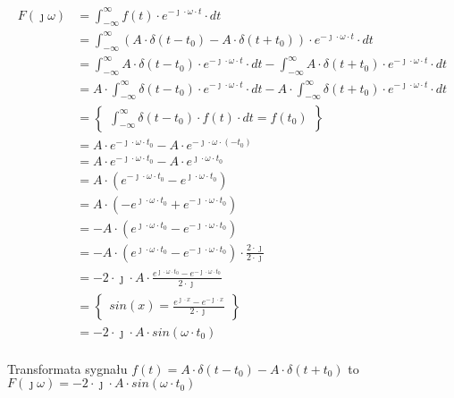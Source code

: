 \begin{task}
\begin{align*}
F(\jmath \omega )&=\int_{-\infty }^{\infty}f(t) \cdot e^{-\jmath \cdot \omega \cdot t}\cdot dt\\
&=\int_{-\infty }^{\infty} \left( A \cdot \delta(t-t_0) - A \cdot \delta(t+t_0) \right)\cdot e^{-\jmath \cdot \omega \cdot t} \cdot dt\\
&=\int_{-\infty }^{\infty} A \cdot \delta(t-t_0) \cdot e^{-\jmath \cdot \omega \cdot t} \cdot dt - \int_{-\infty }^{\infty} A \cdot \delta(t+t_0) \cdot e^{-\jmath \cdot \omega \cdot t} \cdot dt\\
&= A \cdot \int_{-\infty }^{\infty} \delta(t-t_0) \cdot e^{-\jmath \cdot \omega \cdot t} \cdot dt -  A \cdot \int_{-\infty }^{\infty} \delta(t+t_0) \cdot e^{-\jmath \cdot \omega \cdot t} \cdot dt\\
&=\begin{Bmatrix}
\int_{-\infty }^{\infty} \delta(t-t_0) \cdot f(t) \cdot dt = f(t_0)
\end{Bmatrix}\\
&= A \cdot e^{-\jmath \cdot \omega \cdot t_0} -  A \cdot e^{-\jmath \cdot \omega \cdot (-t_0)}\\
&= A \cdot e^{-\jmath \cdot \omega \cdot t_0} -  A \cdot e^{\jmath \cdot \omega \cdot t_0}\\
&= A \cdot \left(e^{-\jmath \cdot \omega \cdot t_0} -  e^{\jmath \cdot \omega \cdot t_0}\right)\\
&= A \cdot \left(-  e^{\jmath \cdot \omega \cdot t_0} +  e^{-\jmath \cdot \omega \cdot t_0}\right)\\
&= -A \cdot \left(e^{\jmath \cdot \omega \cdot t_0} -  e^{-\jmath \cdot \omega \cdot t_0}\right)\\
&= -A \cdot \left(e^{\jmath \cdot \omega \cdot t_0} -  e^{-\jmath \cdot \omega \cdot t_0}\right)\cdot \frac{2\cdot \jmath}{2\cdot \jmath}\\
&= -2 \cdot \jmath \cdot A \cdot \frac{e^{\jmath \cdot \omega \cdot t_0} -  e^{-\jmath \cdot \omega \cdot t_0}}{2\cdot \jmath}\\
&=\begin{Bmatrix}
sin(x) = \frac{e^{\jmath \cdot x} - e^{-\jmath \cdot x}}{2\cdot \jmath}
\end{Bmatrix}\\
&= -2 \cdot \jmath \cdot A \cdot sin(\omega \cdot t_0)\\
\end{align*}

Transformata sygnału $f(t)=A \cdot \delta(t-t_0) - A \cdot \delta(t+t_0)$ to $F(\jmath \omega)=-2 \cdot \jmath \cdot A \cdot sin(\omega \cdot t_0)$



\end{task}
